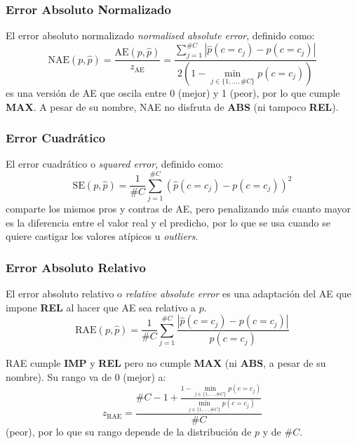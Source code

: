 \subsubsection{Error Absoluto Normalizado}\label{evaluacion:nae}

El error absoluto normalizado {\it normalised absolute error}, definido como:
\begin{equation}
    {\text{NAE}(p, \hat p)} = \frac{\text{AE}(p, \hat p)}{z_{\text{AE}}} = \frac{\sum \limits_{j=1}^{\#C}{|\hat p(c=c_j) - p(c=c_j)|}}{2(1-\displaystyle \min_{j\in\{1,\dots,\#C\}}p(c=c_j))}\label{evaluacion:eq_nae}
\end{equation}
es una versión de AE que oscila entre 0 (mejor) y 1 (peor), por lo que cumple
{\bf MAX}. A pesar de su nombre, NAE no disfruta de {\bf ABS} (ni tampoco {\bf
REL}).

\subsubsection{Error Cuadrático}\label{evaluacion:se}

El error cuadrático o {\it squared error}, definido como:
\begin{equation}
    {\text{SE}(p, \hat p)} = \frac{1}{\#C}\sum \limits_{j=1}^{\#C}{{(\hat p(c=c_j) - p(c=c_j))}^2}\label{evaluacion:eq_se}
\end{equation}
comparte los mismos pros y contras de AE, pero penalizando más cuanto mayor es
la diferencia entre el valor real y el predicho, por lo que se usa cuando se
quiere castigar los valores atípicos u {\it outliers}.

\subsubsection{Error Absoluto Relativo}\label{evaluacion:rae}

El error absoluto relativo o {\it relative absolute error\/} es una adaptación
del AE que impone {\bf REL} al hacer que AE sea relativo a $p$.
\begin{equation}
    {\text{RAE}(p, \hat p)} = \frac{1}{\#C}\sum \limits_{j=1}^{\#C}{\frac{|\hat p(c=c_j) - p(c=c_j)|}{p(c=c_j)}}\label{evaluacion:eq_rae}
\end{equation}

RAE cumple {\bf IMP} y {\bf REL} pero no cumple {\bf MAX} (ni {\bf ABS}, a pesar
de su nombre). Su rango va de 0 (mejor) a:
\begin{equation}
    z_{\text{RAE}} = \frac{\#C - 1 + \frac {1 - \displaystyle \min_{j\in\{1,\dots,\#C\}}p(c=c_j)}{\displaystyle \min_{j\in\{1,\dots,\#C\}}p(c=c_j)}}{\#C}\label{evaluacion:eq_zrae}
\end{equation}
(peor), por lo que su rango depende de la distribución de $p$ y de $\#C$.

